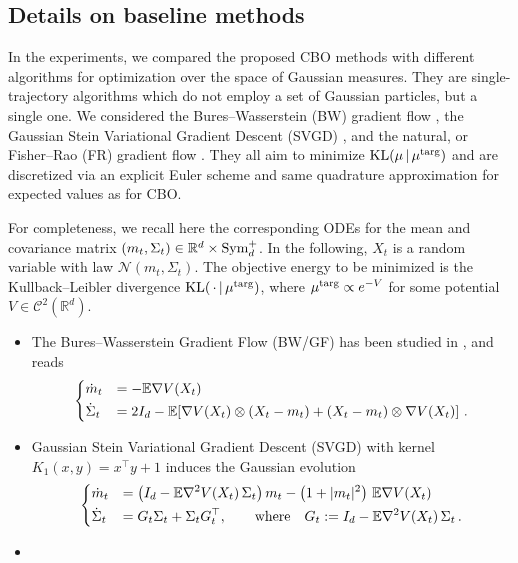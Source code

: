 \documentclass{article}
\theoremstyle{plain}
\theoremstyle{definition}
\theoremstyle{remark}
\newcommand{\psd}{\textup{Sym}^{+}_d}
\newcommand{\KL}{\textup{KL}}
\newcommand{\targ}{\textup{targ}}
\newcommand{\rev}{}
\begin{document}
\rev{\subsection{Details on baseline methods}
\label{app:baseline}

In the experiments, we compared the proposed CBO methods with different algorithms for optimization over the space of Gaussian measures. They are single-trajectory algorithms which do not employ a set of Gaussian particles, but a single one. We considered the Bures--Wasserstein (BW) gradient flow \cite{lambert2022variational}, the Gaussian Stein Variational Gradient Descent (SVGD) \cite{liu2023towards}, and the natural, or Fisher--Rao (FR) gradient flow \cite{barfoot2020multivariate,liero2025evolution}. They all aim to minimize $\KL(\mu\,|\,\mu^\targ)$ and are discretized via an explicit Euler scheme and same quadrature approximation for expected values as for CBO. 

For completeness, we recall here the corresponding ODEs for the mean and covariance matrix $(m_t,\Sigma_t)\in \mathbb{R}^d\times\psd$. In the following, $X_t$ is a random variable with law $\mathcal{N}(m_t,\Sigma_t)$. The objective energy to be minimized is the Kullback--Leibler divergence $\KL(\,\cdot\,\vert\,\mu^\targ)$, where $\mu^\targ \propto e^{-V}$ for some potential $V\in\mathcal{C}^2(\mathbb{R}^d)$.

\begin{itemize}
\item 
The Bures--Wasserstein Gradient Flow (BW/GF) has been studied in \cite{lambert2022variational}, and reads
\begin{equation}
\begin{dcases} \dot{m}_t &=  - \mathbb{E}\nabla V(X_t) \\  \dot{\Sigma}_t &= 2I_d - \mathbb{E}\!\left[\nabla V(X_t)\otimes (X_t-m_t) + (X_t-m_t)\otimes \nabla V(X_t)\right]\, .
\end{dcases}
\end{equation}

\item 
Gaussian Stein Variational Gradient Descent (SVGD) with kernel $ K_1(x,y)=x^\top y+1 $
induces the Gaussian evolution \cite{liu2023towards}
\begin{equation}
\begin{dcases}
\dot{m}_t
&=
\left(I_d-\mathbb{E}\nabla^2V(X_t)\,\Sigma_t\right)m_t
-
\left(1+\lvert m_t\rvert^2\right)\,\mathbb{E}\nabla V(X_t) \\ 
\dot{\Sigma}_t
& =
G_t\Sigma_t+\Sigma_t G_t^\top, \qquad \textup{where}\quad G_t
:=
I_d-\mathbb{E}\nabla^2V(X_t)\,\Sigma_t\,.
\end{dcases}
\end{equation}
\item 


\end{itemize}}
\end{document}
